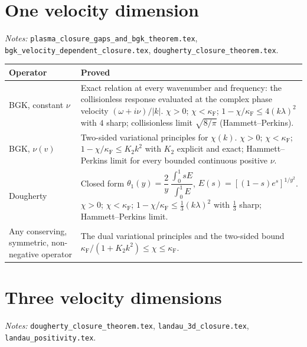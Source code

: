 \documentclass[11pt]{article}
\begin{document}
\section{One velocity dimension}

\emph{Notes:} \texttt{plasma\_closure\_gaps\_and\_bgk\_theorem.tex},
\texttt{bgk\_velocity\_dependent\_closure.tex},
\texttt{dougherty\_closure\_theorem.tex}.

\begin{center}
\renewcommand{\arraystretch}{1.35}
\begin{tabular}{>{\raggedright}p{3.6cm}p{10.8cm}}
  Operator & Proved \\ \hline
  BGK, constant $\nu$
    & Exact relation at every wavenumber and frequency: the collisionless
      response evaluated at the complex phase velocity
      $(\omega+i\nu)/|k|$. $\chi>0$; $\chi<\kappa_{\mathrm F}$;
      $1-\chi/\kappa_{\mathrm F}\le4(k\lambda)^2$ with $4$ sharp;
      collisionless limit $\sqrt{8/\pi}$ (Hammett--Perkins). \\
  BGK, $\nu(v)$
    & Two-sided variational principles for $\chi(k)$. $\chi>0$;
      $\chi<\kappa_{\mathrm F}$; $1-\chi/\kappa_{\mathrm F}\le K_2k^2$ with
      $K_2$ explicit and exact; Hammett--Perkins limit for every bounded
      continuous positive $\nu$. \\
  Dougherty
    & Closed form
      $\theta_1(y)=\dfrac{2}{y}\,\dfrac{\int_0^1sE}{\int_0^1E}$,
      $E(s)=[(1-s)e^s]^{1/y^2}$. $\chi>0$; $\chi<\kappa_{\mathrm F}$;
      $1-\chi/\kappa_{\mathrm F}\le\tfrac13(k\lambda)^2$ with $\tfrac13$
      sharp; Hammett--Perkins limit. \\
  Any conserving, symmetric, non-negative operator
    & The dual variational principles and the two-sided bound
      $\kappa_{\mathrm F}/(1+K_2k^2)\le\chi\le\kappa_{\mathrm F}$. \\
\end{tabular}
\end{center}

\section{Three velocity dimensions}

\emph{Notes:} \texttt{dougherty\_closure\_theorem.tex},
\texttt{landau\_3d\_closure.tex}, \texttt{landau\_positivity.tex}.
\end{document}
